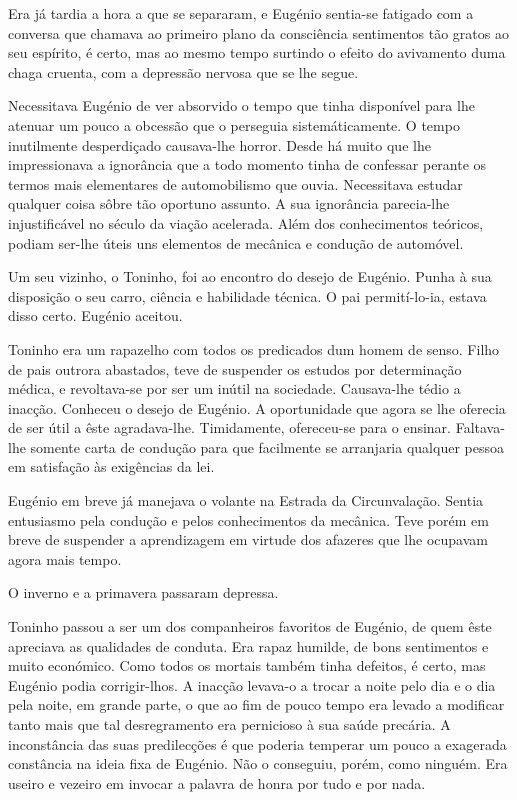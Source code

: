 \documentclass[9pt]{article}
\begin{document}
Era já tardia a hora a que se separaram, e Eugé\-nio sentia-se fatigado
com a conversa que chamava ao primeiro plano da consciência sentimentos
tão gratos ao seu espírito, é certo, mas ao mesmo tempo surtindo o efeito
do avivamento duma chaga cruenta, com a depressão nervosa que se lhe segue.

Necessitava Eugé\-nio de ver absorvido o tempo que tinha disponível para lhe atenuar um pouco a obcessão que o perseguia sistemáticamen\-te. O tempo inutilmente desperdiçado causava-lhe horror. Desde há
muito que lhe impressionava a ignorância que a todo momento tinha
de confessar perante os termos mais elementares de automobilismo que
ouvia. Necessitava estudar qualquer coisa sôbre tão oportuno assunto.
A sua ignorância parecia-\-lhe injustificável no século da via\-ção acelerada. Além dos conhecimentos teóricos, podiam ser-\-lhe úteis uns elementos de me\-câ\-ni\-ca e condu\-ção de automóvel.

Um seu vizinho, o Toninho, foi ao encontro do desejo de Eugé\-nio.
Punha à sua disposi\-ção o seu carro, ciência e habilidade técnica. O
pai permití-lo-ia, estava disso certo. Eugé\-nio aceitou.

Toninho era um rapaze\-lho com todos os predicados dum homem de
senso. Fi\-lho de pais outrora abastados, teve de suspender os estudos
por determina\-ção médica, e revoltava-se por ser um inútil na sociedade. Causava-\-lhe tédio a inac\-ção. Conheceu o desejo de Eugé\-nio. A oportunidade que agora se lhe oferecia de ser útil a êste agradava-\-lhe. Timidamente, ofereceu-se para o ensinar. Faltava-\-lhe somente carta de
condu\-ção para que facilmente se arranjaria qualquer pessoa em satisfa\-ção às exi\-gên\-cias da lei.

Eugé\-nio em breve já manejava o volante na Estrada da Circunvala\-ção. Sentia entusiasmo pela condu\-ção e pelos conhecimentos da me\-câ\-ni\-ca. Teve porém em breve de suspender a aprendizagem em virtude dos afazeres
que lhe ocupavam agora mais tempo.

O inverno e a primavera passaram depressa.

Toninho passou a ser um dos companheiros favoritos de Eugé\-nio,
de quem êste apreciava as qualidades de conduta. Era rapaz humilde,
de bons sentimentos e muito económico. Como todos os mortais tam\-bém
tinha defeitos, é certo, mas Eugé\-nio podia corrigir-\-lhos. A inac\-ção levava-o a trocar a noite pelo dia e o dia pela noite, em gran\-de parte,
o que ao fim de pouco tempo era levado a modifi\-car tanto mais que tal
desregramento era pernicioso à sua saúde precária. A inconstância das
suas predilec\-ções é que poderia temperar um pouco a exagerada constância na ideia fixa de Eugé\-nio. Não o conseguiu, porém, como nin\-guém. Era useiro e vezeiro em invocar a palavra de honra por tudo e por nada.
\end{document}
